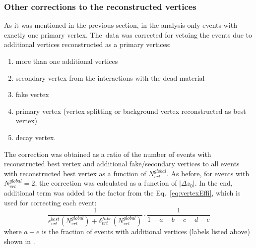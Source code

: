 \subsubsection{Other corrections to the reconstructed vertices}
As it was mentioned in  the previous section, in the analysis only events with exactly one primary vertex. The~data was corrected for vetoing the events due to additional vertices reconstructed as a primary vertices:
\begin{enumerate}[label=(\alph*)]
\item more than one additional vertices
\item secondary vertex from the interactions with the dead material
\item fake vertex
\item primary vertex (vertex splitting or background vertex reconstructed as best vertex) 
\item decay vertex.  
\end{enumerate}
The correction was obtained as a ratio of the number of events with reconstructed best vertex
and additional fake/secondary vertices to all events with reconstructed best vertex as a function of $N^{global}_{vrt}$. As before, for events with $N^{global}_{vrt}=2$, the correction was calculated as a function of $|\Delta z_0|$. In the end, additional term was added to the factor from the Eq.~\ref{eq:vertexEffi}, which is used for correcting each event: 
\begin{equation}
\frac{1}{\epsilon_{vrt}^ {best}\left(N_{vrt}^{global}\right) + \delta_{vrt}^{fake}\left(N_{vrt}^{global}\right)}\cdot\frac{1}{1-a-b-c-d-e}
\end{equation}
where $a-e$ is the fraction of events with additional vertices (labels listed above) shown in .
